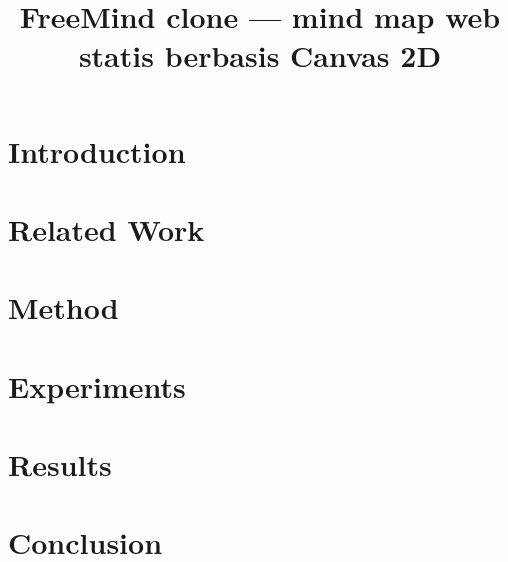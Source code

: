 \documentclass{article}
\title{FreeMind clone — mind map web statis berbasis Canvas 2D}
\author{}
\date{}
\begin{document}
\maketitle

\begin{abstract}
\end{abstract}

\section{Introduction}

\section{Related Work}

\section{Method}

\section{Experiments}

\section{Results}

\section{Conclusion}


\end{document}

